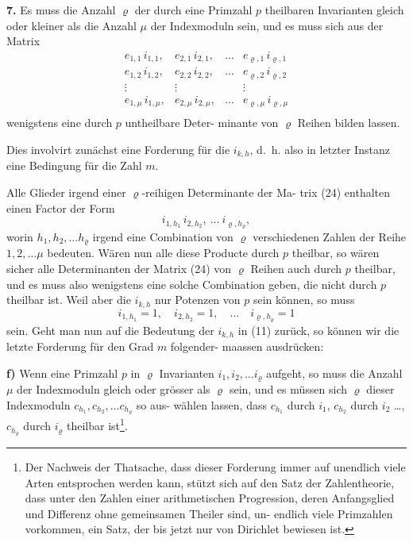 \documentclass[12pt,a4paper]{article}
\begin{document}
\newpage

\medskip
\noindent\textbf{7.} Es muss die Anzahl $\varrho$ der durch eine Primzahl $p$
theilbaren Invarianten gleich oder kleiner
als die Anzahl $\mu$ der Indexmoduln sein, und es
muss sich aus der Matrix
\begin{equation}\label{eq:k21-24}
\begin{array}{cccc}
e_{1,1}\, i_{1,1}, & e_{2,1}\, i_{2,1}, & \ldots & e_{\varrho,1}\, i_{\varrho,1} \\
e_{1,2}\, i_{1,2}, & e_{2,2}\, i_{2,2}, & \ldots & e_{\varrho,2}\, i_{\varrho,2} \\
\vdots & \vdots & & \vdots \\
e_{1,\mu}\, i_{1,\mu}, & e_{2,\mu}\, i_{2,\mu}, & \ldots & e_{\varrho,\mu}\, i_{\varrho,\mu} \\
\end{array}
\end{equation}
wenigstens eine durch $p$ untheilbare Deter-
minante von $\varrho$ Reihen bilden lassen.

Dies involvirt zun\"achst eine Forderung f\"ur die $i_{k,h}$, d.~h. also
in letzter Instanz eine Bedingung f\"ur die Zahl $m$.

Alle Glieder irgend einer $\varrho$-reihigen Determinante der Ma-
trix (24) enthalten einen Factor der Form
\[i_{1,h_1}\, i_{2,h_2},\ \ldots\ i_{\varrho,h_\varrho},\]
worin $h_1, h_2, \ldots h_\varrho$ irgend eine Combination von $\varrho$ verschiedenen
Zahlen der Reihe $1, 2, \ldots \mu$ bedeuten. W\"aren nun alle diese
Producte durch $p$ theilbar, so w\"aren sicher alle Determinanten
der Matrix (24) von $\varrho$ Reihen auch durch $p$ theilbar, und es
muss also wenigstens eine solche Combination geben, die nicht
durch $p$ theilbar ist. Weil aber die $i_{k,h}$ nur Potenzen von $p$ sein
k\"onnen, so muss
\[i_{1,h_1} = 1,\quad i_{2,h_2} = 1,\quad \ldots\quad i_{\varrho,h_\varrho} = 1\]
sein. Geht man nun auf die Bedeutung der $i_{k,h}$ in (11) zur\"uck,
so k\"onnen wir die letzte Forderung f\"ur den Grad $m$ folgender-
maassen ausdr\"ucken:

\medskip
\noindent\textbf{f)} Wenn eine Primzahl $p$ in $\varrho$ Invarianten $i_1, i_2, \ldots i_\varrho$
aufgeht, so muss die Anzahl $\mu$ der Indexmoduln
gleich oder gr\"osser als $\varrho$ sein, und es m\"ussen
sich $\varrho$ dieser Indexmoduln $c_{h_1}, c_{h_2}, \ldots c_{h_\varrho}$ so aus-
w\"ahlen lassen, dass $c_{h_1}$ durch $i_1$, $c_{h_2}$ durch $i_2$ \ldots,
$c_{h_\varrho}$ durch $i_\varrho$ theilbar ist\footnote{Der Nachweis der Thatsache, dass dieser Forderung immer auf
unendlich viele Arten entsprochen werden kann, st\"utzt sich auf den Satz
der Zahlentheorie, dass unter den Zahlen einer arithmetischen Progression,
deren Anfangsglied und Differenz ohne gemeinsamen Theiler sind, un-
endlich viele Primzahlen vorkommen, ein Satz, der bis jetzt nur von
Dirichlet bewiesen ist.}.
\end{document}
